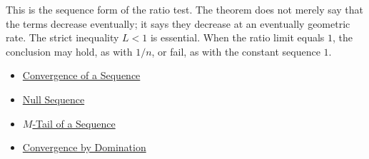\begin{remark*}[Interpretation]
This is the sequence form of the ratio test. The theorem does not merely say
that the terms decrease eventually; it says they decrease at an eventually
geometric rate. The strict inequality $L<1$ is essential. When the ratio
limit equals $1$, the conclusion may hold, as with $1/n$, or fail, as with
the constant sequence $1$.
\end{remark*}

\begin{dependencies}
\begin{itemize}
  \item \hyperref[def:convergent-sequence]{Convergence of a Sequence}
  \item \hyperref[def:null-sequence]{Null Sequence}
  \item \hyperref[def:m-tail]{$M$-Tail of a Sequence}
  \item \hyperref[thm:convergence-by-domination]{Convergence by Domination}
\end{itemize}
\end{dependencies}
